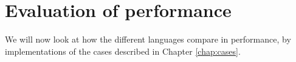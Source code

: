 
\chapter{Evaluation of performance}
\label{chap:performance}
We will now look at how the different languages compare in
performance, by implementations of the cases described in Chapter
\ref{chap:cases}.






